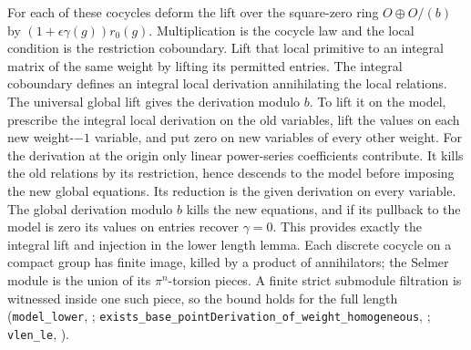 For each of these cocycles deform the lift over the square-zero ring
$O\oplus O/(b)$ by $(1+\epsilon\gamma(g))r_0(g)$. Multiplication is
the cocycle law and the local condition is the restriction coboundary.
Lift that local primitive to an integral matrix of the same weight
by lifting its permitted entries. The integral coboundary defines an
integral local derivation annihilating the local relations. The
universal global lift gives the derivation modulo $b$. To lift it on
the model, prescribe the integral local derivation on the old
variables, lift the values on each new weight-$-1$ variable, and put
zero on new variables of every other weight. For the derivation at
the origin only linear power-series coefficients contribute. It kills
the old relations by its restriction, hence descends to the model
before imposing the new global equations. Its reduction is the given
derivation on every variable. The global derivation modulo $b$ kills
the new equations, and if its pullback to the model is zero its values
on entries recover $\gamma=0$. This provides exactly the integral
lift and injection in the lower length lemma. Each discrete cocycle on
a compact group has finite image, killed by a product of annihilators;
the Selmer module is the union of its $\pi^n$-torsion pieces. A finite
strict submodule filtration is witnessed inside one such piece, so the
bound holds for the full length
(\nolinkurl{model_lower}, ;
\nolinkurl{exists_base_pointDerivation_of_weight_homogeneous},
;
\nolinkurl{vlen_le}, ).

